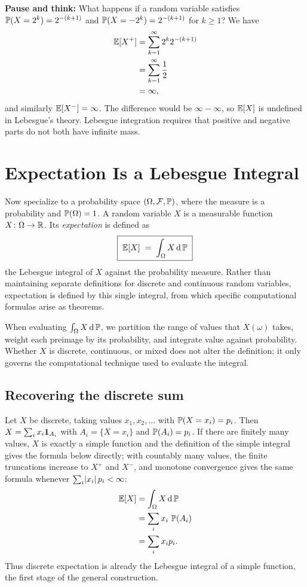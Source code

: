 \begin{recoverybox}
\textbf{Pause and think:} What happens if a random variable satisfies $\P(X = 2^k) = 2^{-(k+1)}$ and $\P(X = -2^k) = 2^{-(k+1)}$ for $k \ge 1$? We have
\begin{align*}
  \E[X^+] &= \sum_{k=1}^\infty 2^k 2^{-(k+1)} \\
          &= \sum_{k=1}^\infty \frac{1}{2} \\
          &= \infty,
\end{align*}
and similarly $\E[X^-] = \infty$. The difference would be $\infty - \infty$, so $\E[X]$ is undefined in Lebesgue's theory. Lebesgue integration requires that positive and negative parts do not both have infinite mass.
\end{recoverybox}

\section{Expectation Is a Lebesgue Integral}
\label{ch37:expectation}

Now specialize to a probability space $(\Omega,\mathcal F,\P)$, where the measure
is a probability and $\P(\Omega)=1$. A random variable $X$ is a measurable
function $X\colon\Omega\to\R$. Its \emph{expectation} is defined as
\[
  \boxed{\;\E[X] \;=\; \int_\Omega X\,\dd\P\;}
\]
the Lebesgue integral of $X$ against the probability measure. Rather than
maintaining separate definitions for discrete and continuous random variables,
expectation is defined by this single integral, from which specific computational
formulas arise as theorems.

\begin{happeningbox}
When evaluating $\int_\Omega X\,\dd\P$, we partition the range of values that
$X(\omega)$ takes, weight each preimage by its probability, and integrate value
against probability. Whether $X$ is discrete, continuous, or mixed does not alter
the definition; it only governs the computational technique used to evaluate
the integral.
\end{happeningbox}

\subsection{Recovering the discrete sum}

Let $X$ be discrete, taking values $x_1,x_2,\dots$ with $\P(X=x_i)=p_i$. Then
$X=\sum_i x_i
\ind_{A_i}$ with $A_i=\{X=x_i\}$ and $\P(A_i)=p_i$. If there are finitely many values,
$X$ is exactly a simple function and the definition of the simple integral gives the formula
below directly; with countably many values, the finite truncations increase to $X^+$ and
$X^-$, and monotone convergence gives the same formula whenever $\sum_i \abs{x_i}\,p_i < \infty$:
\begin{align*}
  \E[X] &= \int_\Omega X\,\dd\P \\
        &= \sum_i x_i\,\P(A_i) \\
        &= \sum_i x_i p_i .
\end{align*}
Thus discrete expectation is already the Lebesgue integral of a simple function,
the first stage of the general construction.

